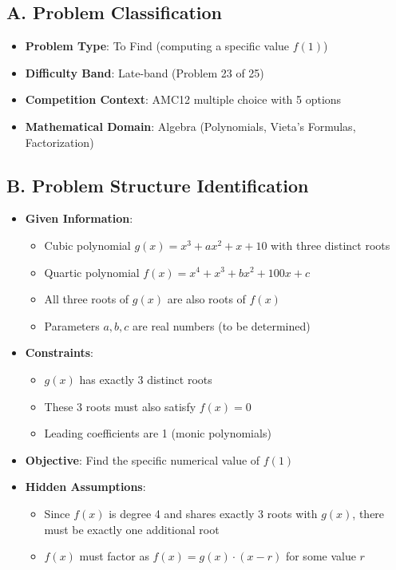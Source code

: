 \documentclass[]{article}
\begin{document}
\begin{problemconfigbox}
\subsection*{A. Problem Classification}
\begin{itemize}[leftmargin=*]
    \item \textbf{Problem Type}: To Find (computing a specific value $f(1)$)
    \item \textbf{Difficulty Band}: Late-band (Problem 23 of 25)
    \item \textbf{Competition Context}: AMC12 multiple choice with 5 options
    \item \textbf{Mathematical Domain}: Algebra (Polynomials, Vieta's Formulas, Factorization)
\end{itemize}

\subsection*{B. Problem Structure Identification}
\begin{itemize}[leftmargin=*]
    \item \textbf{Given Information}: 
    \begin{itemize}
        \item Cubic polynomial $g(x) = x^3 + ax^2 + x + 10$ with three distinct roots
        \item Quartic polynomial $f(x) = x^4 + x^3 + bx^2 + 100x + c$
        \item All three roots of $g(x)$ are also roots of $f(x)$
        \item Parameters $a, b, c$ are real numbers (to be determined)
    \end{itemize}
    
    \item \textbf{Constraints}: 
    \begin{itemize}
        \item $g(x)$ has exactly 3 distinct roots
        \item These 3 roots must also satisfy $f(x) = 0$
        \item Leading coefficients are 1 (monic polynomials)
    \end{itemize}
    
    \item \textbf{Objective}: Find the specific numerical value of $f(1)$
    
    \item \textbf{Hidden Assumptions}: 
    \begin{itemize}
        \item Since $f(x)$ is degree 4 and shares exactly 3 roots with $g(x)$, there must be exactly one additional root
        \item $f(x)$ must factor as $f(x) = g(x) \cdot (x - r)$ for some value $r$
    \end{itemize}
    

\end{itemize}
\end{problemconfigbox}
\end{document}
